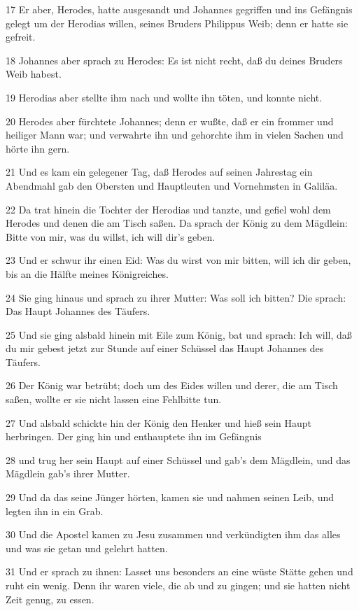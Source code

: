 \par 17 Er aber, Herodes, hatte ausgesandt und Johannes gegriffen und ins Gefängnis gelegt um der Herodias willen, seines Bruders Philippus Weib; denn er hatte sie gefreit.
\par 18 Johannes aber sprach zu Herodes: Es ist nicht recht, daß du deines Bruders Weib habest.
\par 19 Herodias aber stellte ihm nach und wollte ihn töten, und konnte nicht.
\par 20 Herodes aber fürchtete Johannes; denn er wußte, daß er ein frommer und heiliger Mann war; und verwahrte ihn und gehorchte ihm in vielen Sachen und hörte ihn gern.
\par 21 Und es kam ein gelegener Tag, daß Herodes auf seinen Jahrestag ein Abendmahl gab den Obersten und Hauptleuten und Vornehmsten in Galiläa.
\par 22 Da trat hinein die Tochter der Herodias und tanzte, und gefiel wohl dem Herodes und denen die am Tisch saßen. Da sprach der König zu dem Mägdlein: Bitte von mir, was du willst, ich will dir's geben.
\par 23 Und er schwur ihr einen Eid: Was du wirst von mir bitten, will ich dir geben, bis an die Hälfte meines Königreiches.
\par 24 Sie ging hinaus und sprach zu ihrer Mutter: Was soll ich bitten? Die sprach: Das Haupt Johannes des Täufers.
\par 25 Und sie ging alsbald hinein mit Eile zum König, bat und sprach: Ich will, daß du mir gebest jetzt zur Stunde auf einer Schüssel das Haupt Johannes des Täufers.
\par 26 Der König war betrübt; doch um des Eides willen und derer, die am Tisch saßen, wollte er sie nicht lassen eine Fehlbitte tun.
\par 27 Und alsbald schickte hin der König den Henker und hieß sein Haupt herbringen. Der ging hin und enthauptete ihn im Gefängnis
\par 28 und trug her sein Haupt auf einer Schüssel und gab's dem Mägdlein, und das Mägdlein gab's ihrer Mutter.
\par 29 Und da das seine Jünger hörten, kamen sie und nahmen seinen Leib, und legten ihn in ein Grab.
\par 30 Und die Apostel kamen zu Jesu zusammen und verkündigten ihm das alles und was sie getan und gelehrt hatten.
\par 31 Und er sprach zu ihnen: Lasset uns besonders an eine wüste Stätte gehen und ruht ein wenig. Denn ihr waren viele, die ab und zu gingen; und sie hatten nicht Zeit genug, zu essen.
